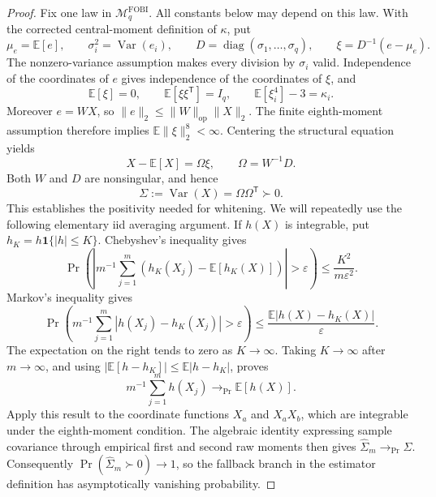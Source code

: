 \documentclass{article}
\begin{document}
\begin{proof}
Fix one law in \(\mathcal M_q^{\mathrm{FOBI}}\). All constants below may depend on this law. With the corrected central-moment definition of \(\kappa\), put
\[
 \mu_e=\mathbb E[e],
 \qquad
 \sigma_i^2=\operatorname{Var}(e_i),
 \qquad
 D=\operatorname{diag}(\sigma_1,\ldots,\sigma_q),
 \qquad
 \xi=D^{-1}(e-\mu_e).
\]
The nonzero-variance assumption makes every division by \(\sigma_i\) valid. Independence of the coordinates of \(e\) gives independence of the coordinates of \(\xi\), and
\[
 \mathbb E[\xi]=0,
 \qquad
 \mathbb E[\xi\xi^{\mathsf T}]=I_q,
 \qquad
 \mathbb E[\xi_i^4]-3=\kappa_i.
\]
Moreover \(e=WX\), so \(\|e\|_2\leq\|W\|_{\mathrm{op}}\|X\|_2\). The finite eighth-moment assumption therefore implies \(\mathbb E\|\xi\|_2^8<\infty\). Centering the structural equation yields
\[
 X-\mathbb E[X]=\Omega\xi,
 \qquad
 \Omega=W^{-1}D.
\]
Both \(W\) and \(D\) are nonsingular, and hence
\[
 \Sigma:=\operatorname{Var}(X)=\Omega\Omega^{\mathsf T}\succ0.
\]
This establishes the positivity needed for whitening. We will repeatedly use the following elementary iid averaging argument. If \(h(X)\) is integrable, put \(h_K=h\mathbf 1\{|h|\leq K\}\). Chebyshev's inequality gives
\[
 \Pr\!\left(
  \left|m^{-1}\sum_{j=1}^m(h_K(X_j)-\mathbb E[h_K(X)])\right|>\varepsilon
 \right)
 \leq\frac{K^2}{m\varepsilon^2}.
\]
Markov's inequality gives
\[
 \Pr\!\left(
  m^{-1}\sum_{j=1}^m|h(X_j)-h_K(X_j)|>\varepsilon
 \right)
 \leq\frac{\mathbb E|h(X)-h_K(X)|}{\varepsilon}.
\]
The expectation on the right tends to zero as \(K\to\infty\). Taking \(K\to\infty\) after \(m\to\infty\), and using \(|\mathbb E[h-h_K]|\leq\mathbb E|h-h_K|\), proves
\[
 m^{-1}\sum_{j=1}^m h(X_j)\longrightarrow_{\Pr}\mathbb E[h(X)].
\]
Apply this result to the coordinate functions \(X_a\) and \(X_aX_b\), which are integrable under the eighth-moment condition. The algebraic identity expressing sample covariance through empirical first and second raw moments then gives \(\widehat\Sigma_m\to_{\Pr}\Sigma\). Consequently \(\Pr(\widehat\Sigma_m\succ0)\to1\), so the fallback branch in the estimator definition has asymptotically vanishing probability.


\end{proof}
\end{document}
